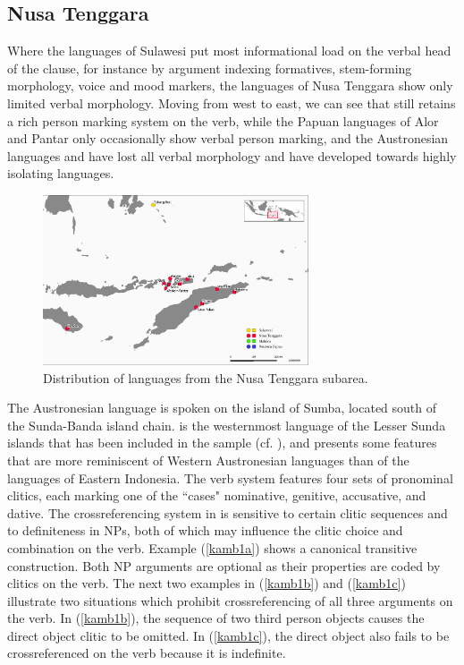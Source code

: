 \subsection{Nusa Tenggara} \label{sec:nus}

Where the languages of Sulawesi put most informational load on the verbal head of the clause, for instance by argument indexing formatives, stem-forming morphology, voice and mood markers, the languages of Nusa Tenggara show only limited verbal morphology. Moving from west to east, we can see that  still retains a rich person marking system on the verb, while the Papuan languages of Alor and Pantar only occasionally show verbal person marking, and the Austronesian languages  and  have lost all verbal morphology and have developed towards highly isolating languages.

\begin{figure}

\includegraphics[width=0.7\textwidth]{figures/languages_Nusa.pdf}
\caption{Distribution of languages from the Nusa Tenggara subarea.}\label{map:Nus}

\end{figure}  

\largerpage[-1]
The Austronesian language  is spoken on the island of Sumba, located south of the Sunda-Banda island chain.  is the westernmost language of the Lesser Sunda islands that has been included in the sample (cf. ), and presents some features that are more reminiscent of Western Austronesian languages than of the languages of Eastern Indonesia. The verb system features four sets of pronominal clitics, each marking one of the ``cases" nominative, genitive, accusative, and dative. The crossreferencing system in  is sensitive to certain clitic sequences and to definiteness in NPs, both of which may influence the clitic choice and combination on the verb. Example (\ref{kamb1a}) shows a canonical transitive construction. Both NP arguments are optional as their properties are coded by clitics on the verb. The next two examples in (\ref{kamb1b}) and (\ref{kamb1c}) illustrate two situations which prohibit crossreferencing of all three arguments on the verb. In (\ref{kamb1b}), the sequence of two third person objects causes the direct object clitic to be omitted. In (\ref{kamb1c}), the direct object also fails to be crossreferenced on the verb because it is indefinite.

